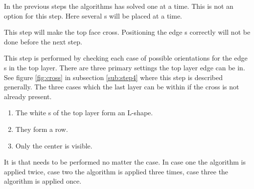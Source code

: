 In the previous steps the algorithms has solved one \cpiece{} at a time. 
This is not an option for this step. 
Here several \cpiece{}s will be placed at a time. 

This step will make the top face cross. 
Positioning the edge \cpiece{}s correctly will not be done before the next step. 

This step is performed by checking each case of possible orientations for the edge \cpiece{}s in the top layer. 
There are three primary settings the top layer edge \cpiece{} can be in. See figure \ref{fig:cross} in subsection \ref{sub:step4} where this step is described generally.
The three cases which the last layer can be within if the cross is not already present.
\begin{enumerate}
\item The white \facelet{}s of the top layer form an L-shape.
\item They form a row.
\item Only the center \facelet{} is visible. 
\end{enumerate}
It is  that needs to be performed no matter the case. In case one the algorithm is applied twice, case two the algorithm is applied three times, case three the algorithm is applied once.